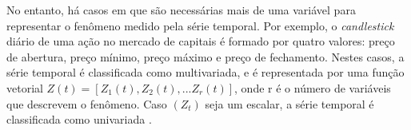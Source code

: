 No entanto, há casos em que são necessárias mais de uma variável para
representar o fenômeno medido pela série temporal. Por exemplo, o
\emph{candlestick} diário de uma ação no mercado de capitais é formado por
quatro valores: preço de abertura, preço mínimo, preço máximo e preço de
fechamento. Nestes casos, a série temporal é classificada como multivariada, e é
representada por uma função vetorial
$Z\left(t\right) =
	\left[
		Z_1\left(t\right),
		Z_2\left(t\right),
		...
		Z_r\left(t\right)
	\right]$,
onde r é o número de variáveis que descrevem o fenômeno. Caso $\left(Z_t\right)$
seja um escalar, a série temporal é classificada como univariada
\cite{morettin2006analise}.
